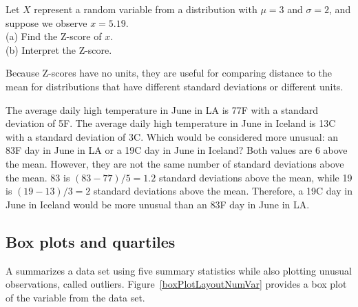 \begin{exercisewrap}
\begin{nexercise}
Let $X$ represent a random variable from a distribution with $\mu=3$ and $\sigma=2$,
and suppose we observe $x=5.19$. \\
(a)
    Find the Z-score of $x$. \\
(b)
    Interpret the Z-score.\footnotemark
\end{nexercise}
\end{exercisewrap}


Because Z-scores have no units, they are useful for comparing distance to the mean for distributions that have different standard deviations or different units.

\begin{examplewrap}
\begin{nexample}
{The average daily high temperature in June in LA is 77\degree F with a standard deviation of 5\degree{}F.  The average daily high temperature in June in Iceland is 13\degree{}C with a standard deviation of 3\degree{}C.  Which would be considered more unusual:  an 83\degree{}F day in June in LA or a 19\degree{}C day in June in Iceland? }
Both values are 6\degree{} above the mean.  However, they are not the same number of standard deviations above the mean.  83 is $(83-77)/5 = 1.2$ standard deviations above the mean, while 19 is $(19-13)/3 = 2$ standard deviations above the mean.  Therefore, a 19\degree{}C day in June in Iceland would be more unusual than an 83\degree{}F day in June in LA.
\end{nexample}
\end{examplewrap}




\subsection{Box plots and quartiles}

A  summarizes a data set using five summary statistics while also plotting unusual observations, called outliers. Figure~\ref{boxPlotLayoutNumVar} provides a box plot of the  variable from the  data set.

